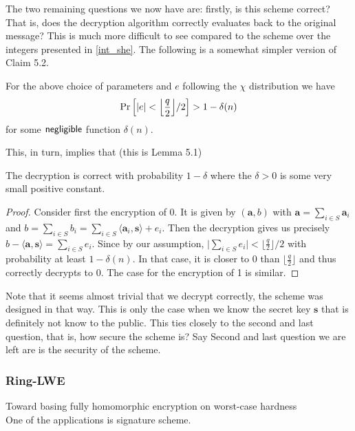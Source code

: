 The two remaining questions we now have are: firstly, is this scheme correct? That is, does the decryption algorithm correctly evaluates back to the original message? This is much more difficult to see compared to the scheme over the integers presented in \ref{int_she}. The following is a somewhat simpler version of Claim 5.2.
\begin{claim}[Correctness]
    For the above choice of parameters and $e$ following the $\chi$ distribution we have
    \begin{equation} \Pr \Big[ |e| < \Bigl \lfloor \frac{q}{2} \Bigr \rfloor /2 \Big] > 1 - \delta(n) \end{equation}
    for some $\alg{negligible}$ function $\delta(n)$.
\end{claim}
This, in turn, implies that (this is Lemma 5.1)
\begin{theorem}
    The decryption is correct with probability $1 - \delta$ where the $\delta > 0$ is some very small positive constant.
\end{theorem}

\begin{proof}
    Consider first the encryption of 0. It is given by $(\bm{a}, b)$ with $\bm{a} = \sum_{i \in S}\bm{a}_i$ and $b = \sum_{i \in S} b_i = \sum_{i \in S} \langle \bm{a}_i, \bm{s} \rangle + e_i$. Then the decryption gives us precisely $b - \langle \bm{a}, \bm{s} \rangle = \sum_{i \in S} e_i$. Since by our assumption, $\big| \sum_{i \in S} e_i \big| < \bigl \lfloor \frac{q}{2} \bigr \rfloor /2$ with probability at least $1 - \delta(n)$. In that case, it is closer to 0 than $\bigl \lfloor \frac{q}{2} \bigr \rfloor$ and thus correctly decrypts to 0. The case for the encryption of 1 is similar.
\end{proof}

Note that it seems almost trivial that we decrypt correctly, the scheme was designed in that way. This is only the case when we know the secret key $\bm{s}$ that is definitely not know to the public. This ties closely to the second and last question, that is, how secure the scheme is? Say
Second and last question we are left are is the security of the scheme.

\subsubsection*{Ring-LWE}
\cite{ring-lwe} 
Toward basing fully homomorphic encryption on worst-case hardness \\
One of the applications is \cite{qTESLA} signature scheme.

